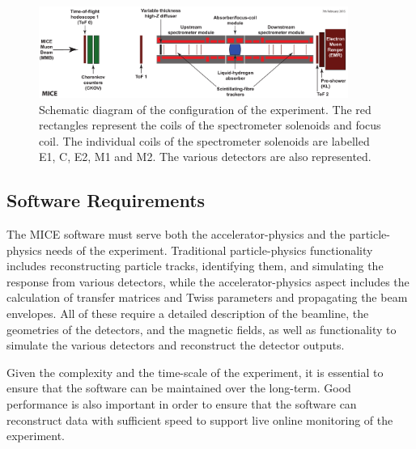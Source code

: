 \documentclass{JINST}
\begin{document}

\begin{figure}[!htb]
\centering
\includegraphics[width=0.9\textwidth]{figs/step4-layout.pdf}
\caption{ Schematic diagram of the configuration of the experiment. The red rectangles represent the coils of the spectrometer solenoids and focus coil. The individual coils of the spectrometer solenoids are labelled E1, C, E2, M1 and M2. The various detectors are also represented.}
\label{fig:step4}
\end{figure}


\subsection{Software Requirements} \label{sec:requirements}

The MICE software must serve both the accelerator-physics and the particle-physics needs of the experiment. Traditional particle-physics functionality includes reconstructing particle tracks, identifying them, and simulating the response from various detectors, while the accelerator-physics aspect includes the calculation of transfer matrices and Twiss parameters and propagating the beam envelopes. All of these require a detailed description of the beamline, the geometries of the detectors, and the magnetic fields, as well as functionality to simulate the various detectors and reconstruct the detector outputs. 

Given the complexity and the time-scale of the experiment, it is essential to ensure that the software can be maintained over the long-term. Good performance is also important in order to ensure that the software can reconstruct data with sufficient speed to support live online monitoring of the experiment.

\end{document}
